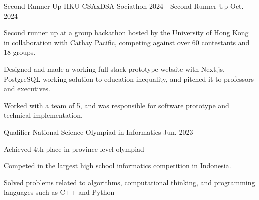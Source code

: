 
\begin{cventries}

  \cventry
    {Second Runner Up} %
    {HKU CSAxDSA Sociathon 2024 - Second Runner Up} %
    {} 
    {Oct. 2024} %
    {
      \begin{cvitems} %
        \item {Second runner up at a group hackathon hosted by the University of Hong Kong in collaboration with Cathay
Pacific, competing against over 60 contestants and 18 groups.}
        \item {Designed and made a working full stack prototype website with Next.js, PostgreSQL working solution to
education inequality, and pitched it to professors and executives.}
        \item {Worked with a team of 5, and was responsible for software prototype and technical implementation.}
      \end{cvitems}
    }
  
  \cventry
    {Qualifier} %
    {National Science Olympiad in Informatics} %
    {} 
    {Jun. 2023} %
    {
      \begin{cvitems} %
        \item {Achieved 4th place in province-level olympiad}
        \item {Competed in the largest high school informatics competition in Indonesia.}
        \item {Solved problems related to algorithms, computational thinking, and programming languages such as C++ and
Python}
      \end{cvitems}
    }
  
\end{cventries}



  


